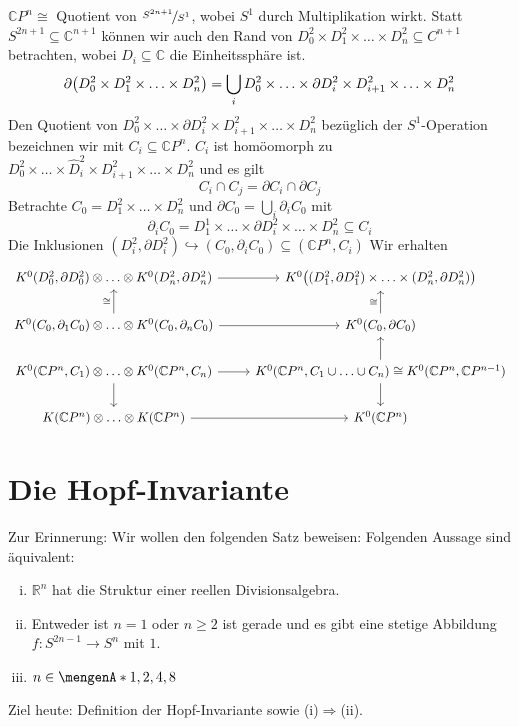 $\mathds{C}P^n \cong$ Quotient von $\nicefrac{S^{2n+1}}{S^1}$, wobei $S^1$ durch Multiplikation wirkt. Statt $S^{2n+1} \subseteq \mathds{C}^{n+1}$ können wir auch den Rand
von $D_0^2 \times D_1^2 \times \ldots \times D_n^2 \subseteq C^{n+1}$ betrachten, wobei $D_i \subseteq \mathds{C}$ die Einheitssphäre ist.
\[
	\partial \enbrace*{D_0^2 \times D_1^2 \times \ldots \times D_n^2} = \bigcup_i D_0^2 \times \ldots \times \partial D_i^2 \times D_{i+1}^2 \times \ldots \times D_n^2 
\]
Den Quotient von $D_0^2 \times \ldots \times \partial D_i^2 \times D_{i+1}^2 \times \ldots \times D_n^2 $ bezüglich der $S^1$-Operation bezeichnen wir mit 
$C_i \subseteq \mathds{C}P^n$. $C_i$ ist homöomorph zu $D_0^2 \times \ldots \times \hat{D}_i^2 \times D_{i+1}^2 \times \ldots \times D_n^2 $ und es gilt
\[
	C_i \cap C_j = \partial C_i \cap \partial C_j
\]
Betrachte $C_0 = D_1^2 \times \ldots \times D_n^2$ und $\partial C_0 = \bigcup_i \partial_i C_0$ mit 
\[
	\partial_i C_0 = D_1^1 \times \ldots \times \partial D_i^2 \times \ldots \times D_n^2 \subseteq C_i
\]
Die Inklusionen $(D_i^2,\partial D_i^2) \hookrightarrow (C_0,\partial_i C_0) \subseteq (\mathds{C}P^n,C_i)$ Wir erhalten 
\[
	\begin{tikzcd}
			K^0(D^2_0,\partial D_0^2) \otimes  \ldots \otimes K^0(D_n^2,\partial D_n^2) \rar 
			& K^0 \enbrace*{ (D_1^2,\partial D_1^2) \times \ldots \times (D_n^2, \partial D_n^2)} \\
			K^0(C_0,\partial_1 C_0) \otimes \ldots \otimes K^0(C_0,\partial_n C_0) \rar \uar["\cong"] & K^0(C_0,\partial C_0) \uar["\cong"] \\
			K^0(\mathds{C}P^n,C_1) \otimes \ldots \otimes K^0(\mathds{C}P^n,C_n) \rar \dar & K^0(\mathds{C}P^n, C_1 \cup \ldots \cup C_n) \cong 
			K^0(\mathds{C}P^n,\mathds{C}P^{n-1}) \dar \uar\\
			K(\mathds{C}P^n) \otimes \ldots \otimes K(\mathds{C}P^n) \rar & K^0(\mathds{C}P^n)
	\end{tikzcd}
\]
\newpage

\section{Die Hopf-Invariante} %
\label{sec:die_hopf_invariante}
Zur Erinnerung: Wir wollen den folgenden Satz beweisen:
Folgenden Aussage sind äquivalent:
\begin{enumerate}[(i)]
	\item $\mathds{R}^n$ hat die Struktur einer reellen Divisionsalgebra.
	\item Entweder ist $n=1$ oder $n\ge 2$ ist gerade und es gibt eine stetige Abbildung $f \colon S^{2n-1} \to S^n$ mit  $1$.
	\item $n \in \set{1,2,4,8}$
\end{enumerate}
Ziel heute: Definition der Hopf-Invariante sowie (i)$\Rightarrow $(ii).


